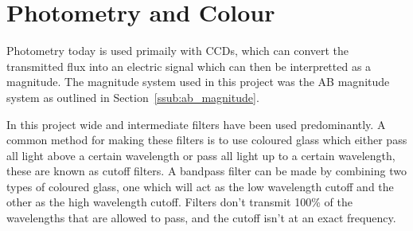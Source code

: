 
\section{Photometry and Colour} %
\label{sec:Photometry_Colour}
	Photometry today is used primaily with CCDs, which can convert the transmitted flux into an electric signal which can then be interpretted as a magnitude. The magnitude system used in this project was the AB magnitude system as outlined in Section~\ref{ssub:ab_magnitude}.

	In this project wide and intermediate filters have been used predominantly. A common method for making these filters is to use coloured glass which either pass all light above a certain wavelength or pass all light up to a certain wavelength, these are known as cutoff filters. A bandpass filter can be made by combining two types of coloured glass, one which will act as the low wavelength cutoff and the other as the high wavelength cutoff. Filters don't transmit 100\% of the wavelengths that are allowed to pass, and the cutoff isn't at an exact frequency.

